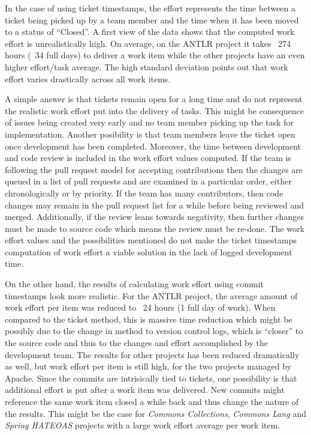 \documentclass{mpaper}
\begin{document}
In the case of using ticket timestamps, the effort represents the time between a
ticket being picked up by a team member and the time when it has been moved to a
status of ``Closed''. A first view of the data shows that the computed work
effort is unrealistically high. On average, on the ANTLR project it takes ~274
hours (~34 full days) to deliver a work item while the other projects have an
even higher effort/task average. The high standard deviation points out that
work effort varies drastically across all work items.

A simple answer is that tickets remain open for a long time and do not represent
the realistic work effort put into the delivery of tasks. This might be
consequence of issues being created very early and no team member picking up the
task for implementation. Another posibility is that team members leave the
ticket open once development has been completed. Moreover, the time between
development and code review is included in the work effort values computed. If
the team is following the pull request model for accepting contributions then
the changes are queued in a list of pull requests and are examined in a
particular order, either chronologically or by priority. If the team has many
contributors, then code changes may remain in the pull request list for a while
before being reviewed and merged. Additionally, if the review leans towards
negativity, then further changes must be made to source code which means the
review must be re-done. The work effort values and the possibilities mentioned
do not make the ticket timestamps computation of work effort a viable solution
in the lack of logged development time.

On the other hand, the results of calculating work effort using commit
timestamps look more realistic. For the ANTLR project, the average amount of
work effort per item was reduced to ~24 hours (1 full day of work). When
compared to the ticket method, this is massive time reduction which might be
possibly due to the change in method to version control logs, which is
``closer'' to the source code and thus to the changes and effort accomplished by
the development team. The results for other projects has been reduced
dramatically as well, but work effort per item is still high, for the two
projects managed by Apache. Since the commits are intrisically tied to tickets,
one possibility is that additional effort is put after a work item was
delivered. New commits might reference the same work item closed a while back
and thus change the nature of the results. This might be the case for
\emph{Commons Collections}, \emph{Commons Lang} and \emph{Spring HATEOAS}
projects with a large work effort average per work item.
\end{document}

